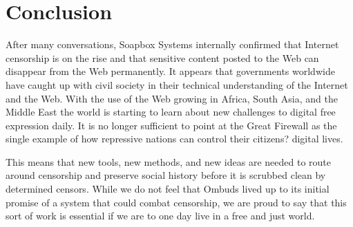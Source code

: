 \documentclass[a4paper]{article}
\begin{document}
\section{Conclusion}
	After many conversations, Soapbox Systems internally confirmed that Internet censorship is on the rise and that sensitive content posted to the Web can disappear from the Web permanently. It appears that governments worldwide have caught up with civil society in their technical understanding of the Internet and the Web. With the use of the Web growing in Africa, South Asia, and the Middle East the world is starting to learn about new challenges to digital free expression daily. It is no longer sufficient to point at the Great Firewall as the single example of how repressive nations can control their citizens? digital lives.\par	
	This means that new tools, new methods, and new ideas are needed to route around censorship and preserve social history before it is scrubbed clean by determined censors. While we do not feel that Ombuds lived up to its initial promise of a system that could combat censorship, we are proud to say that this sort of work is essential if we are to one day live in a free and just world.\par
\end{document}

